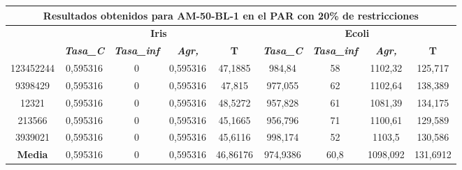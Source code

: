 \documentclass[12pt, spanish]{article}
\begin{document}
\begin{table}[H]
\footnotesize
\begin{tabular}{|c|c|c|c|c|c|c|c|c|}
\hline
\multicolumn{9}{|c|}{\textbf{Resultados obtenidos para AM-50-BL-1 en el PAR con 20\% de restricciones}}                                                                                                           \\ \hline
\multirow{2}{*}{} & \multicolumn{4}{c|}{\textbf{Iris}}                                                            & \multicolumn{4}{c|}{\textbf{Ecoli}}                                                           \\ \cline{2-9} 
                  & \textit{\textbf{Tasa\_C}} & \textit{\textbf{Tasa\_inf}} & \textit{\textbf{Agr,}} & \textbf{T} & \textit{\textbf{Tasa\_C}} & \textit{\textbf{Tasa\_inf}} & \textit{\textbf{Agr,}} & \textbf{T} \\ \hline
123452244         & 0,595316                  & 0                           & 0,595316               & 47,1885    & 984,84                    & 58                          & 1102,32                & 125,717    \\ \hline
9398429           & 0,595316                  & 0                           & 0,595316               & 47,815     & 977,055                   & 62                          & 1102,64                & 138,389    \\ \hline
12321             & 0,595316                  & 0                           & 0,595316               & 48,5272    & 957,828                   & 61                          & 1081,39                & 134,175    \\ \hline
213566            & 0,595316                  & 0                           & 0,595316               & 45,1665    & 956,796                   & 71                          & 1100,61                & 129,589    \\ \hline
3939021           & 0,595316                  & 0                           & 0,595316               & 45,6116    & 998,174                   & 52                          & 1103,5                 & 130,586    \\ \hline
\textbf{Media}    & 0,595316                  & 0                           & 0,595316               & 46,86176   & 974,9386                  & 60,8                        & 1098,092               & 131,6912   \\ \hline
\end{tabular}
\end{table}
\end{document}
